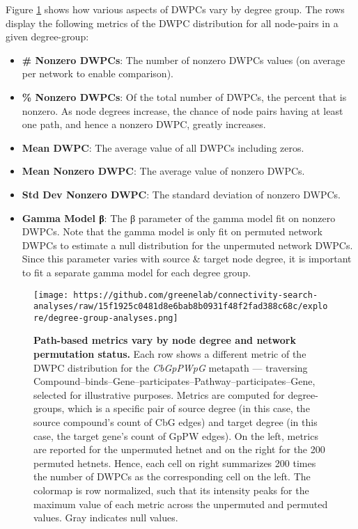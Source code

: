 Figure \ref{fig:degree-group-metrics} shows how various aspects of DWPCs vary by degree group.
The rows display the following metrics of the DWPC distribution for all node-pairs in a given degree-group:

\begin{itemize}
\tightlist
\item
  \textbf{\# Nonzero DWPCs}:
  The number of nonzero DWPCs values (on average per network to enable comparison).
\item
  \textbf{\% Nonzero DWPCs}:
  Of the total number of DWPCs, the percent that is nonzero.
  As node degrees increase, the chance of node pairs having at least one path, and hence a nonzero DWPC, greatly increases.
\item
  \textbf{Mean DWPC}:
  The average value of all DWPCs including zeros.
\item
  \textbf{Mean Nonzero DWPC}:
  The average value of nonzero DWPCs.
\item
  \textbf{Std Dev Nonzero DWPC}:
  The standard deviation of nonzero DWPCs.
\item
  \textbf{Gamma Model β}:
  The β parameter of the gamma model fit on nonzero DWPCs.
  Note that the gamma model is only fit on permuted network DWPCs to estimate a null distribution for the unpermuted network DWPCs.
  Since this parameter varies with source \& target node degree,
  it is important to fit a separate gamma model for each degree group.
\end{itemize}

\begin{figure}
\hypertarget{fig:degree-group-metrics}{%
\centering
\texttt{[image: https://github.com/greenelab/connectivity-search-analyses/raw/15f1925c0481d8e6bab8b0931f48f2fad388c68c/explore/degree-group-analyses.png]}
\caption{\textbf{Path-based metrics vary by node degree and network permutation status.}
Each row shows a different metric of the DWPC distribution for the \emph{CbGpPWpG} metapath --- traversing Compound--binds--Gene--participates--Pathway--participates--Gene, selected for illustrative purposes.
Metrics are computed for degree-groups,
which is a specific pair of source degree (in this case, the source compound's count of CbG edges)
and target degree (in this case, the target gene's count of GpPW edges).
On the left, metrics are reported for the unpermuted hetnet and on the right for the 200 permuted hetnets.
Hence, each cell on right summarizes 200 times the number of DWPCs as the corresponding cell on the left.
The colormap is row normalized, such that its intensity peaks for the maximum value of each metric across the unpermuted and permuted values.
Gray indicates null values.}\label{fig:degree-group-metrics}
}
\end{figure}

